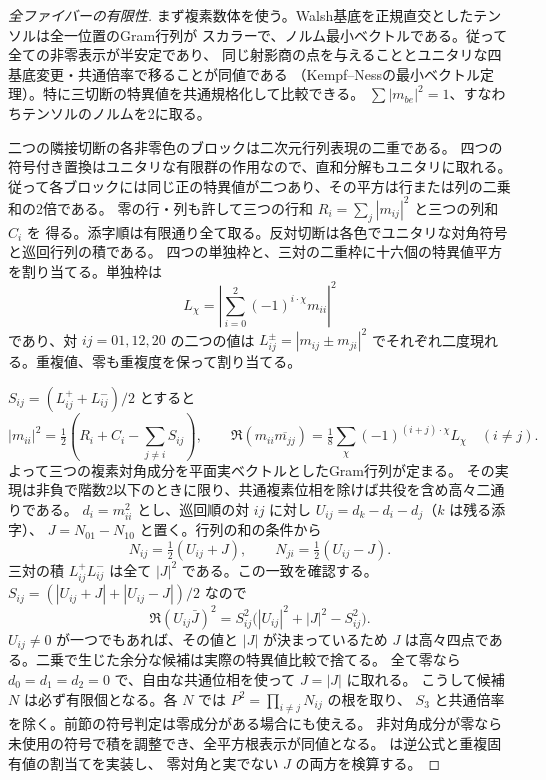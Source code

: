 \begin{proof}[全ファイバーの有限性]
まず複素数体を使う。Walsh基底を正規直交としたテンソルは全一位置のGram行列が
スカラーで、ノルム最小ベクトルである。従って全ての非零表示が半安定であり、
同じ射影商の点を与えることとユニタリな四基底変更・共通倍率で移ることが同値である
（Kempf--Nessの最小ベクトル定理）。特に三切断の特異値を共通規格化して比較できる。
$\sum|m_{be}|^2=1$、すなわちテンソルのノルムを2に取る。

二つの隣接切断の各非零色のブロックは二次元行列表現の二重である。
四つの符号付き置換はユニタリな有限群の作用なので、直和分解もユニタリに取れる。
従って各ブロックには同じ正の特異値が二つあり、その平方は行または列の二乗和の2倍である。
零の行・列も許して三つの行和 $R_i=\sum_j|m_{ij}|^2$ と三つの列和 $C_i$ を
得る。添字順は有限通り全て取る。反対切断は各色でユニタリな対角符号と巡回行列の積である。
四つの単独枠と、三対の二重枠に十六個の特異値平方を割り当てる。単独枠は
\[
 L_\chi=\left|\sum_{i=0}^2(-1)^{i\cdot\chi}m_{ii}\right|^2
\]
であり、対 $ij=01,12,20$ の二つの値は
$L_{ij}^\pm=|m_{ij}\pm m_{ji}|^2$ でそれぞれ二度現れる。重複値、零も重複度を保って割り当てる。

$S_{ij}=(L_{ij}^++L_{ij}^-)/2$ とすると
\[
 |m_{ii}|^2=\tfrac12(R_i+C_i-\sum_{j\ne i}S_{ij}),\qquad
 \Re(m_{ii}\overline{m_{jj}})=\tfrac18\sum_\chi(-1)^{(i+j)\cdot\chi}L_\chi
 \quad(i\ne j).
\]
よって三つの複素対角成分を平面実ベクトルとしたGram行列が定まる。
その実現は非負で階数2以下のときに限り、共通複素位相を除けば共役を含め高々二通りである。
$d_i=m_{ii}^2$ とし、巡回順の対 $ij$ に対し $U_{ij}=d_k-d_i-d_j$（$k$ は残る添字）、
$J=N_{01}-N_{10}$ と置く。行列の和の条件から
\[
 N_{ij}=\tfrac12(U_{ij}+J),\qquad N_{ji}=\tfrac12(U_{ij}-J).
\]
三対の積 $L_{ij}^+ L_{ij}^-$ は全て $|J|^2$ である。この一致を確認する。
$S_{ij}=(|U_{ij}+J|+|U_{ij}-J|)/2$ なので
\[
 \Re(U_{ij}\bar J)^2=S_{ij}^2\big(|U_{ij}|^2+|J|^2-S_{ij}^2\big).
\]
$U_{ij}\ne0$ が一つでもあれば、その値と $|J|$ が決まっているため
$J$ は高々四点である。二乗で生じた余分な候補は実際の特異値比較で捨てる。
全て零なら $d_0=d_1=d_2=0$ で、自由な共通位相を使って $J=|J|$ に取れる。
こうして候補 $N$ は必ず有限個となる。各 $N$ では $P^2=\prod_{i\ne j}N_{ij}$ の根を取り、
$S_3$ と共通倍率を除く。前節の符号判定は零成分がある場合にも使える。
非対角成分が零なら未使用の符号で積を調整でき、全平方根表示が同値となる。
 は逆公式と重複固有値の割当てを実装し、
零対角と実でない $J$ の両方を検算する。
\end{proof}

